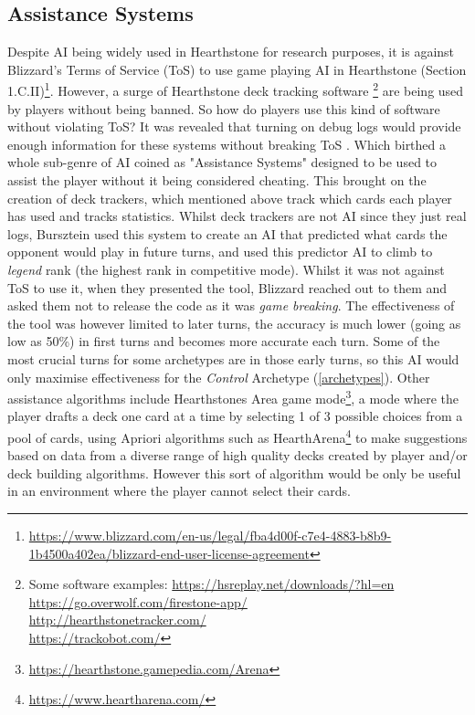 \documentclass{report}
\begin{document}
\subsection{Assistance Systems}
Despite AI being widely used in Hearthstone for research purposes, it is against Blizzard's Terms of Service (ToS) to use game playing AI in Hearthstone (Section 1.C.II)\footnote{\url{https://www.blizzard.com/en-us/legal/fba4d00f-c7e4-4883-b8b9-1b4500a402ea/blizzard-end-user-license-agreement}}. However, a surge of Hearthstone deck tracking software \footnote{Some software examples: \url{https://hsreplay.net/downloads/?hl=en} \\ \url{https://go.overwolf.com/firestone-app/} \\ \url{http://hearthstonetracker.com/}  \\ \url{https://trackobot.com/}} are being used by players without being banned. So how do players use this kind of software without violating ToS? It was revealed that turning on debug logs would provide enough information for these systems without breaking ToS \cite{Flipperbw2014}. Which birthed a whole sub-genre of AI coined as "Assistance Systems" designed to be used to assist the player without it being considered cheating. This brought on the creation of deck trackers, which mentioned above track which cards each player has used and tracks statistics. Whilst deck trackers are not AI since they just real logs, Bursztein \cite{Bursztein2016} used this system to create an AI that predicted what cards the opponent would play in future turns, and used this predictor AI to climb to \textit{legend} rank (the highest rank in competitive mode). Whilst it was not against ToS to use it, when they presented the tool, Blizzard reached out to them and asked them not to release the code as it was \textit{game breaking}. The effectiveness of the tool was however limited to later turns, the accuracy is much lower (going as low as 50\%) in first turns and becomes more accurate each turn. Some of the most crucial turns for some archetypes are in those early turns, so this AI would only maximise effectiveness for the \textit{Control} Archetype (\ref{archetypes}). Other assistance algorithms include Hearthstones Area game mode\footnote{\url{https://hearthstone.gamepedia.com/Arena}}, a mode where the player drafts a deck one card at a time by selecting 1 of 3 possible choices from a pool of cards, using Apriori algorithms \cite{Agrawal1994} such as HearthArena\footnote{\url{https://www.heartharena.com/}} to make suggestions based on  data from a diverse range of high quality decks created by player and/or deck building algorithms\cite{MapElites}. However this sort of algorithm would be only be useful in an environment where the player cannot select their cards. \\ 
\end{document}
